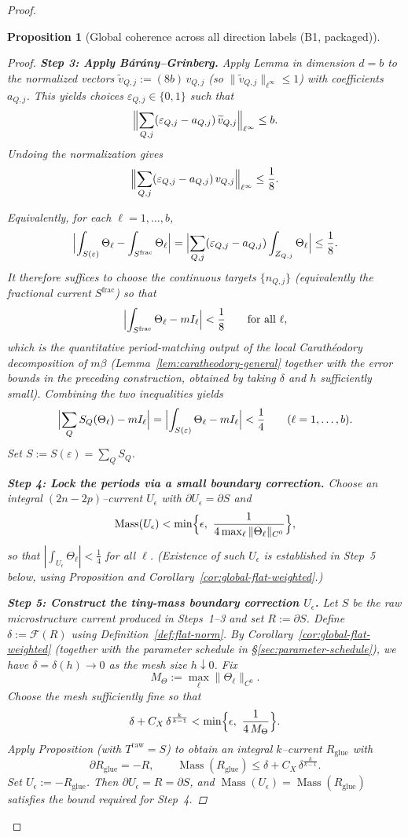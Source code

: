 \documentclass[11pt]{article}
\numberwithin{equation}{section}  %
\theoremstyle{plain}
\newtheorem{proposition}[theorem]{Proposition}
\theoremstyle{definition}
\theoremstyle{remark}
\DeclareMathOperator{\Mass}{Mass}
\begin{document}
\begin{proof}
\begin{proposition}[Global coherence across all direction labels (B1, packaged)]
\begin{enumerate}
\begin{proof}
\smallskip\noindent
\textbf{Step 3: Apply B\'ar\'any--Grinberg.}
Apply Lemma in dimension $d=b$ to the normalized vectors
$\widetilde v_{Q,j}:=(8b)\,v_{Q,j}$ (so $\|\widetilde v_{Q,j}\|_{\ell^\infty}\le 1$) with coefficients $a_{Q,j}$.
This yields choices $\varepsilon_{Q,j}\in\{0,1\}$ such that
\[
\Bigl\|\sum_{Q,j}(\varepsilon_{Q,j}-a_{Q,j})\,\widetilde v_{Q,j}\Bigr\|_{\ell^\infty}\le b.
\]
Undoing the normalization gives
\[
\Bigl\|\sum_{Q,j}(\varepsilon_{Q,j}-a_{Q,j})\,v_{Q,j}\Bigr\|_{\ell^\infty}\le \frac18.
\]

Equivalently, for each $\ell=1,\dots,b$,
\[
\Bigl|\int_{S(\varepsilon)}\Theta_\ell-\int_{S^{\mathrm{frac}}}\Theta_\ell\Bigr|
=\Bigl|\sum_{Q,j}(\varepsilon_{Q,j}-a_{Q,j})\int_{Z_{Q,j}}\Theta_\ell\Bigr|
\le \frac18.
\]
It therefore suffices to choose the continuous targets $\{n_{Q,j}\}$ (equivalently the fractional current $S^{\mathrm{frac}}$) so that
\[
\Bigl|\int_{S^{\mathrm{frac}}}\Theta_\ell - m I_\ell\Bigr|<\frac18\qquad\text{for all }\ell,
\]
which is the quantitative period-matching output of the local Carath{\'e}odory decomposition of $m\beta$
(Lemma~\ref{lem:caratheodory-general} together with the error bounds in the preceding construction, obtained by taking $\delta$ and $h$ sufficiently small).
Combining the two inequalities yields
\[
\Bigl|\sum_Q S_Q(\Theta_\ell)-mI_\ell\Bigr|
=\Bigl|\int_{S(\varepsilon)}\Theta_\ell- m I_\ell\Bigr|
<\frac14
\qquad (\ell=1,\dots,b).
\]
Set $S:=S(\varepsilon)=\sum_Q S_Q$.


\smallskip\noindent

\textbf{Step 4: Lock the periods via a small boundary correction.}
Choose an integral $(2n-2p)$--current $U_\epsilon$ with $\partial U_\epsilon=\partial S$ and
\[
\Mass(U_\epsilon)<\min\Bigl\{\epsilon,\ \frac{1}{4\max_\ell\|\Theta_\ell\|_{C^0}}\Bigr\},
\]
so that $|\int_{U_\epsilon}\Theta_\ell|<\frac14$ for all $\ell$.
(Existence of such $U_\epsilon$ is established in \emph{Step~5} below, using Proposition
and Corollary~\ref{cor:global-flat-weighted}.)

\smallskip\noindent
\textbf{Step 5: Construct the tiny-mass boundary correction $U_\epsilon$.}
Let $S$ be the raw microstructure current produced in Steps~1--3 and set $R:=\partial S$.
Define $\delta:=\mathcal F(R)$ using Definition~\ref{def:flat-norm}.
By Corollary~\ref{cor:global-flat-weighted} (together with the parameter schedule in \S\ref{sec:parameter-schedule}),
we have $\delta=\delta(h)\to 0$ as the mesh size $h\downarrow 0$.
Fix
\[
M_\Theta:=\max_\ell \|\Theta_\ell\|_{C^0}.
\]
Choose the mesh sufficiently fine so that
\[
\delta + C_X\,\delta^{\frac{k}{k-1}}
< \min\Bigl\{\epsilon,\ \frac{1}{4\,M_\Theta}\Bigr\}.
\]
Apply Proposition (with $T^{\mathrm{raw}}=S$) to obtain an integral $k$--current $R_{\mathrm{glue}}$ with
\[
\partial R_{\mathrm{glue}}=-R,\qquad \Mass(R_{\mathrm{glue}})\le \delta + C_X\,\delta^{\frac{k}{k-1}}.
\]
Set $U_\epsilon:=-R_{\mathrm{glue}}$. Then $\partial U_\epsilon=R=\partial S$, and $\Mass(U_\epsilon)=\Mass(R_{\mathrm{glue}})$ satisfies the bound required for Step~4.


\end{proof}
\end{enumerate}
\end{proposition}
\end{proof}
\end{document}
